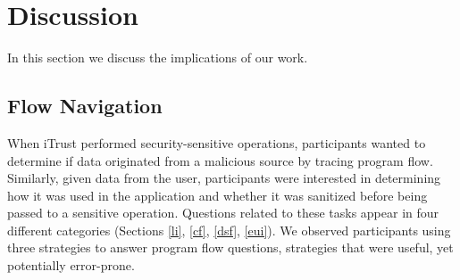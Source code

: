 \documentclass[10pt,journal,compsoc]{IEEEtran}
\begin{document}











\section{Discussion}
\label{sec:discussion}
In this section we discuss the implications of our work.

\subsection{Flow Navigation}
\label{flowNav}
When iTrust performed security-sensitive operations, participants wanted to determine if data originated from a malicious source
by tracing program flow.
Similarly, given data from the user, participants were interested in determining how it was used in the application and whether it was sanitized before being passed to a sensitive operation. Questions related to these tasks appear in four different categories (Sections \ref{li}, \ref{cf}, \ref{dsf}, \ref{eui}).
We observed participants using three strategies to answer program flow questions,
strategies that were useful, yet potentially error-prone.
\end{document}
